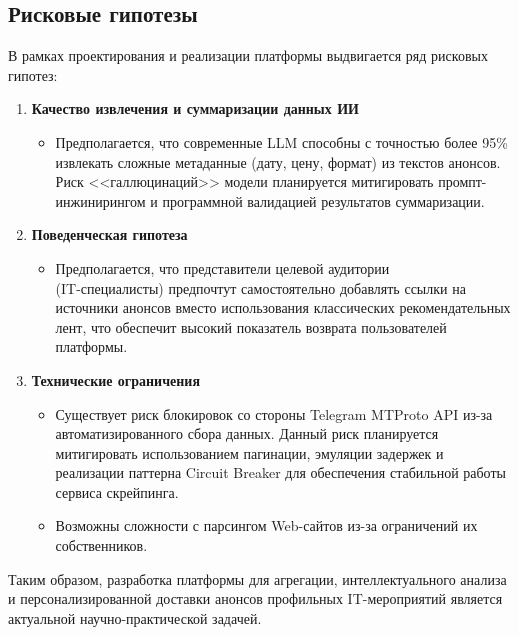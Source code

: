 \subsection*{Рисковые гипотезы}
В рамках проектирования и реализации платформы выдвигается ряд рисковых гипотез:
\begin{enumerate}
\item \textbf{Качество извлечения и суммаризации данных ИИ}
  \begin{itemize}
    \item Предполагается, что современные LLM способны с точностью более 95\% извлекать сложные метаданные (дату, цену, формат) из текстов анонсов. 
    Риск <<галлюцинаций>> модели планируется митигировать промпт-инжинирингом и программной валидацией результатов суммаризации.
  \end{itemize}

\item \textbf{Поведенческая гипотеза} 
  \begin{itemize}
    \item Предполагается, что представители целевой аудитории\\(IT-специалисты) предпочтут самостоятельно добавлять ссылки на источники анонсов вместо использования классических рекомендательных лент, что обеспечит высокий показатель возврата пользователей платформы.
  \end{itemize}

\item \textbf{Технические ограничения}
    \begin{itemize}
        \item Существует риск блокировок со стороны Telegram MTProto API из-за автоматизированного сбора данных. 
        Данный риск планируется митигировать использованием пагинации, эмуляции задержек и реализации паттерна Circuit Breaker для обеспечения стабильной работы сервиса скрейпинга.
        \item Возможны сложности с парсингом Web-сайтов из-за ограничений их собственников.
    \end{itemize}
\end{enumerate}

\vspace{1em}

Таким образом, разработка платформы для агрегации, интеллектуального анализа и персонализированной доставки анонсов профильных IT-мероприятий является актуальной научно-практической задачей.
